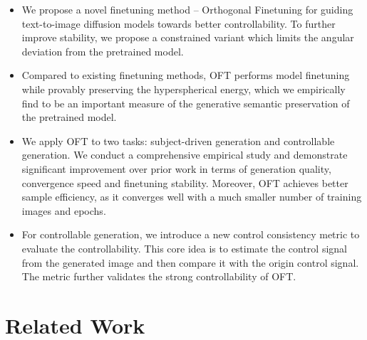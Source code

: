 \vspace{0.25mm}
\begin{itemize}[leftmargin=*,nosep]
\setlength\itemsep{0.4em}
    \item We propose a novel finetuning method -- Orthogonal Finetuning for guiding text-to-image diffusion models towards better controllability. To further improve stability, we propose a constrained variant which limits the angular deviation from the pretrained model.
    \item Compared to existing finetuning methods, OFT performs model finetuning while provably preserving the hyperspherical energy, which we empirically find to be an important measure of the generative semantic preservation of the pretrained model.
    \item We apply OFT to two tasks: subject-driven generation and controllable generation. We conduct a comprehensive empirical study and demonstrate significant improvement over prior work in terms of generation quality, convergence speed and finetuning stability. Moreover, OFT achieves better sample efficiency, as it converges well with a much smaller number of training images and epochs.
    \item For controllable generation, we introduce a new control consistency metric to evaluate the controllability. This core idea is to estimate the control signal from the generated image and then compare it with the origin control signal. The metric further validates the strong controllability of OFT.
\end{itemize}
\vspace{0.5mm}






\vspace{-2mm}
\section{Related Work}
\vspace{-1.46mm}

